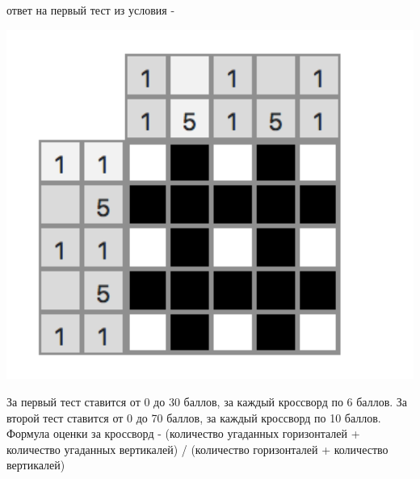 ответ на первый тест из условия - 
\begin{center}
\includegraphics[width=15cm]{crossword.png}
\end{center}
За первый тест ставится от 0 до 30 баллов, за каждый кроссворд по 6 баллов.
За второй тест ставится от 0 до 70 баллов, за каждый кроссворд по 10 баллов.
Формула оценки за кроссворд - (количество угаданных горизонталей + количество угаданных вертикалей) /  (количество горизонталей + количество вертикалей)
